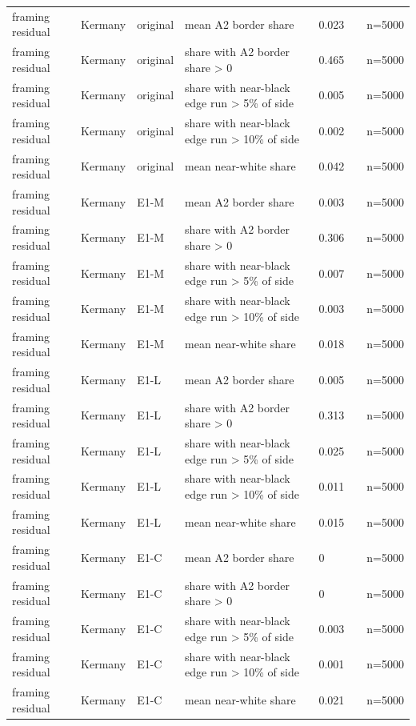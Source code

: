 \begin{longtable}{@{}p{3.3cm}lp{1.5cm}p{3.6cm}p{2.2cm}p{1.6cm}p{3.2cm}@{}}
framing residual & Kermany & original & mean A2 border share & 0.023 &  & n=5000 \\
framing residual & Kermany & original & share with A2 border share > 0 & 0.465 &  & n=5000 \\
framing residual & Kermany & original & share with near-black edge run > 5\% of side & 0.005 &  & n=5000 \\
framing residual & Kermany & original & share with near-black edge run > 10\% of side & 0.002 &  & n=5000 \\
framing residual & Kermany & original & mean near-white share & 0.042 &  & n=5000 \\
framing residual & Kermany & E1-M & mean A2 border share & 0.003 &  & n=5000 \\
framing residual & Kermany & E1-M & share with A2 border share > 0 & 0.306 &  & n=5000 \\
framing residual & Kermany & E1-M & share with near-black edge run > 5\% of side & 0.007 &  & n=5000 \\
framing residual & Kermany & E1-M & share with near-black edge run > 10\% of side & 0.003 &  & n=5000 \\
framing residual & Kermany & E1-M & mean near-white share & 0.018 &  & n=5000 \\
framing residual & Kermany & E1-L & mean A2 border share & 0.005 &  & n=5000 \\
framing residual & Kermany & E1-L & share with A2 border share > 0 & 0.313 &  & n=5000 \\
framing residual & Kermany & E1-L & share with near-black edge run > 5\% of side & 0.025 &  & n=5000 \\
framing residual & Kermany & E1-L & share with near-black edge run > 10\% of side & 0.011 &  & n=5000 \\
framing residual & Kermany & E1-L & mean near-white share & 0.015 &  & n=5000 \\
framing residual & Kermany & E1-C & mean A2 border share & 0 &  & n=5000 \\
framing residual & Kermany & E1-C & share with A2 border share > 0 & 0 &  & n=5000 \\
framing residual & Kermany & E1-C & share with near-black edge run > 5\% of side & 0.003 &  & n=5000 \\
framing residual & Kermany & E1-C & share with near-black edge run > 10\% of side & 0.001 &  & n=5000 \\
framing residual & Kermany & E1-C & mean near-white share & 0.021 &  & n=5000 \\

\end{longtable}
